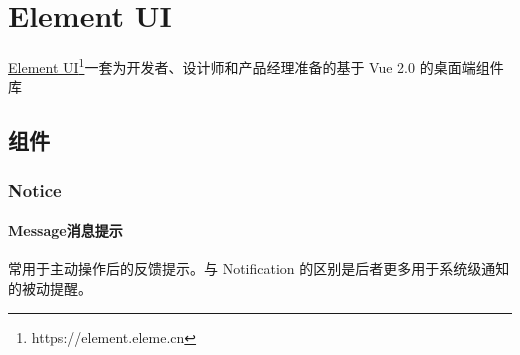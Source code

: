 \chapter{Element UI}
\href{https://element.eleme.cn}{Element UI}\footnote{https://element.eleme.cn}一套为开发者、设计师和产品经理准备的基于 Vue 2.0 的桌面端组件库
\section{组件}
\subsection{Notice}
\subsubsection{Message消息提示}
常用于主动操作后的反馈提示。与 Notification 的区别是后者更多用于系统级通知的被动提醒。